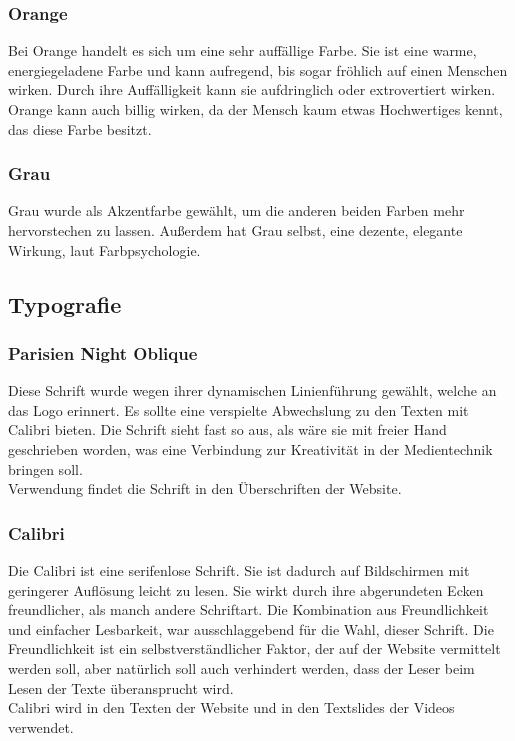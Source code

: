 \subsubsection{Orange}
Bei Orange handelt es sich um eine sehr auffällige Farbe. Sie ist eine warme, energiegeladene Farbe und kann aufregend, bis sogar fröhlich auf einen Menschen wirken. Durch ihre Auffälligkeit kann sie aufdringlich oder extrovertiert wirken. Orange kann auch billig wirken, da der Mensch kaum etwas Hochwertiges kennt, das diese Farbe besitzt. \cite{farblehre}

\subsubsection{Grau}
Grau wurde als Akzentfarbe gewählt, um die anderen beiden Farben mehr hervorstechen zu lassen. Außerdem hat Grau selbst, eine dezente, elegante Wirkung, laut Farbpsychologie.\cite{farbegrau}


\subsection{Typografie}
\subsubsection{Parisien Night Oblique}
Diese Schrift wurde wegen ihrer dynamischen Linienführung gewählt, welche an das Logo erinnert. Es sollte eine verspielte Abwechslung zu den Texten mit Calibri bieten. Die Schrift sieht fast so aus, als wäre sie mit freier Hand geschrieben worden, was eine Verbindung zur Kreativität in der Medientechnik bringen soll.
\\
Verwendung findet die Schrift in den Überschriften der Website.

\subsubsection{Calibri}
Die Calibri ist eine serifenlose Schrift. Sie ist dadurch auf Bildschirmen mit geringerer Auflösung leicht zu lesen. Sie wirkt durch ihre abgerundeten Ecken freundlicher, als manch andere Schriftart.\cite{typocali} Die Kombination aus Freundlichkeit und einfacher Lesbarkeit, war ausschlaggebend für die Wahl, dieser Schrift. Die Freundlichkeit ist ein selbstverständlicher Faktor, der auf der Website vermittelt werden soll, aber natürlich soll auch verhindert werden, dass der Leser beim Lesen der Texte überansprucht wird.
\\
Calibri wird in den Texten der Website und in den Textslides der Videos verwendet.

